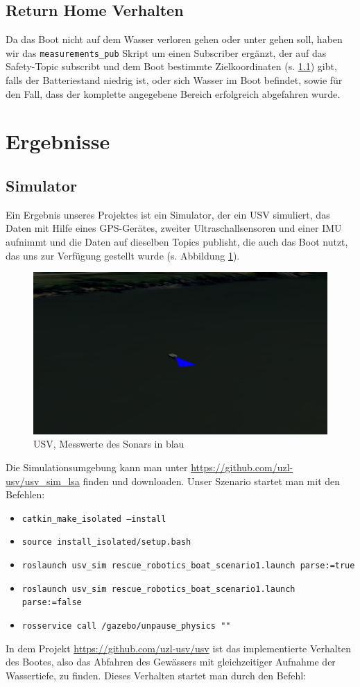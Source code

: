 \documentclass[11pt]{article}
\begin{document}
\subsection{Return Home Verhalten}
Da das Boot nicht auf dem Wasser verloren gehen oder unter gehen soll, haben wir das \texttt{measurements\_pub} Skript um einen Subscriber ergänzt, der auf das Safety-Topic subscribt und dem Boot bestimmte Zielkoordinaten (s. \ref{simulation-ergebnisse}) gibt, falls der Batteriestand niedrig ist, oder sich Wasser im Boot befindet, sowie für den Fall, dass der komplette angegebene Bereich erfolgreich abgefahren wurde.

\section{Ergebnisse}

\subsection{Simulator} \label{simulation-ergebnisse}
Ein Ergebnis unseres Projektes ist ein Simulator, der ein USV simuliert, das Daten mit Hilfe eines GPS-Gerätes, zweiter Ultraschallsensoren und einer IMU aufnimmt und die Daten auf dieselben Topics publisht, die auch das Boot nutzt, das uns zur Verfügung gestellt wurde (s. Abbildung \ref{sonar}).

\begin{figure}[h]
	\centering
	\includegraphics[width=0.8\linewidth]{sonar_boot.jpg}
	\caption{USV, Messwerte des Sonars in blau}
	\label{sonar}
\end{figure}

Die Simulationsumgebung kann man unter \url{https://github.com/uzl-usv/usv_sim_lsa} finden und downloaden. Unser Szenario startet man mit den Befehlen:
\begin{itemize}
	\item \texttt{catkin\_make\_isolated --install}
	\item \texttt{source install\_isolated/setup.bash}
	\item \texttt{roslaunch usv\_sim rescue\_robotics\_boat\_scenario1.launch parse:=true}
	\item \texttt{roslaunch usv\_sim rescue\_robotics\_boat\_scenario1.launch parse:=false}
	\item \texttt{rosservice call /gazebo/unpause\_physics "{}"}
\end{itemize}
In dem Projekt \url{https://github.com/uzl-usv/usv} ist das implementierte Verhalten des Bootes, also das Abfahren des Gewässers mit gleichzeitiger Aufnahme der Wassertiefe, zu finden. Dieses Verhalten startet man durch den Befehl:
\end{document}
